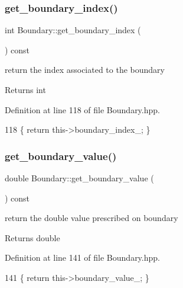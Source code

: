 \subsubsection{\texorpdfstring{get\+\_\+boundary\+\_\+index()}{get\_boundary\_index()}}
{\footnotesize\ttfamily int Boundary\+::get\+\_\+boundary\+\_\+index (\begin{DoxyParamCaption}{ }\end{DoxyParamCaption}) const}



return the index associated to the boundary 

\begin{DoxyReturn}{Returns}
int 
\end{DoxyReturn}


Definition at line 118 of file Boundary.\+hpp.


\begin{DoxyCode}
118 \{ \textcolor{keywordflow}{return} this->boundary\_index\_; \}
\end{DoxyCode}
\mbox{\label{classBoundary_afbd4effd911d4a699bb33d48b5f9396b}} 
\subsubsection{\texorpdfstring{get\+\_\+boundary\+\_\+value()}{get\_boundary\_value()}}
{\footnotesize\ttfamily double Boundary\+::get\+\_\+boundary\+\_\+value (\begin{DoxyParamCaption}{ }\end{DoxyParamCaption}) const}



return the double value prescribed on boundary 

\begin{DoxyReturn}{Returns}
double 
\end{DoxyReturn}


Definition at line 141 of file Boundary.\+hpp.


\begin{DoxyCode}
141 \{ \textcolor{keywordflow}{return} this->boundary\_value\_; \}
\end{DoxyCode}
\mbox{\label{classBoundary_ab367015ba9c9fc55528032cb5b9eca95}} 
